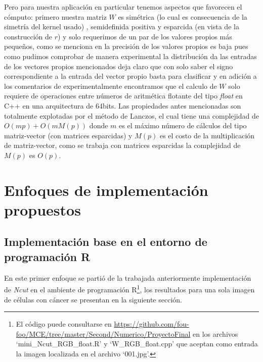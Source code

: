 \documentclass[conference]{IEEEtran}
\begin{document}
Pero para nuestra aplicación en particular tenemos aspectos que favorecen el cómputo: primero nuestra matriz $W$ es simétrica (lo cual es consecuencia de la simetría del kernel usado) , semidefinida positiva y esparcida (en vista de la construcción de $r$) y solo requerimos de un par de los valores propios más pequeños, como se menciona en \cite{Ncut} la precisión de los valores propios es baja pues como pudimos comprobar de manera experimental la distribución da las entradas de los vectores propios mencionados deja claro que con solo saber el signo correspondiente a la entrada del vector propio basta para clasificar y en adición a los comentarios de \cite{Ncut}  experimentalmente encontramos que el calculo de $W$ solo requiere de operaciones entre números de aritmética flotante del tipo \textit{float} en C++ en una arquitectura de 64bits. Las propiedades antes mencionadas son totalmente explotadas por el método de Lanczos, el cual tiene una complejidad de $O(mp)+O(mM(p))$ \cite{MatrixC} donde $m$ es el máximo número de cálculos del tipo matriz-vector (con matrices esparcidas) y $M(p)$ es el costo de la multiplicación de matriz-vector, como se trabaja con matrices esparcidas la complejidad de $M(p)$ es $O(p)$.

\section{Enfoques de implementación propuestos}

\subsection{Implementación base en el entorno de programación R}

En este primer enfoque se partió de la trabajada anteriormente implementación de \textit{Ncut} en el ambiente de programación R\footnote{El código puede consultarse en \url{https://github.com/fou-foo/MCE/tree/master/Second/Numerico/ProyectoFinal} en los archivos ‘mini\_Ncut\_RGB\_float.R’ y ‘W\_RGB\_float.cpp’ que aceptan como entrada la imagen localizada en el archivo ‘001.jpg’.}, los resultados para una sola imagen de células con cáncer se presentan en la siguiente sección.\\
\end{document}
